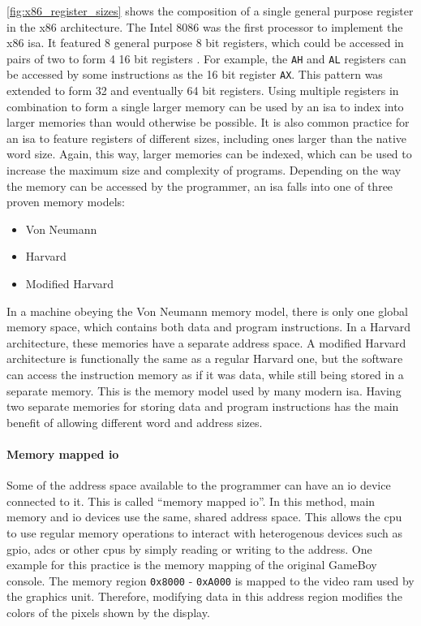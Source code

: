 \autoref{fig:x86_register_sizes} shows the composition of a single general purpose register in the x86 architecture. The Intel 8086 was the first processor to implement the x86 \ac{isa}. It featured 8 general purpose 8 bit registers, which could be accessed in pairs of two to form 4 16 bit registers \cite[p. 1-6]{intelASM86Manual1983}. For example, the \texttt{AH} and \texttt{AL} registers can be accessed by some instructions as the 16 bit register \texttt{AX}. This pattern was extended to form 32 and eventually 64 bit registers. Using multiple registers in combination to form a single larger memory can be used by an \ac{isa} to index into larger memories than would otherwise be possible. It is also common practice for an \ac{isa} to feature registers of different sizes, including ones larger than the native word size. Again, this way, larger memories can be indexed, which can be used to increase the maximum size and complexity of programs.
\clearpage
Depending on the way the memory can be accessed by the programmer, an \ac{isa} falls into one of three proven memory models:

\begin{itemize}
    \item Von Neumann
    \item Harvard
    \item Modified Harvard
\end{itemize}

In a machine obeying the Von Neumann memory model, there is only one global memory space, which contains both data and program instructions. In a Harvard architecture, these memories have a separate address space. A modified Harvard architecture is functionally the same as a regular Harvard one, but the software can access the instruction memory as if it was data, while still being stored in a separate memory. This is the memory model used by many modern \ac{isa}. Having two separate memories for storing data and program instructions has the main benefit of allowing different word and address sizes.

\paragraph*{Memory mapped \ac{io}}

Some of the address space available to the programmer can have an \ac{io} device connected to it. This is called ``memory mapped \ac{io}''. In this method, main memory and \ac{io} devices use the same, shared address space. This allows the \ac{cpu} to use regular memory operations to interact with heterogenous devices such as \ac{gpio}, \acp{adc} or other \acp{cpu} by simply reading or writing to the address. One example for this practice is the memory mapping of the original GameBoy console. The memory region \texttt{0x8000} - \texttt{0xA000} is mapped to the video \ac{ram} used by the graphics unit. Therefore, modifying data in this address region modifies the colors of the pixels shown by the display\cite{nintendo_gb_manual_v1_1}. 

